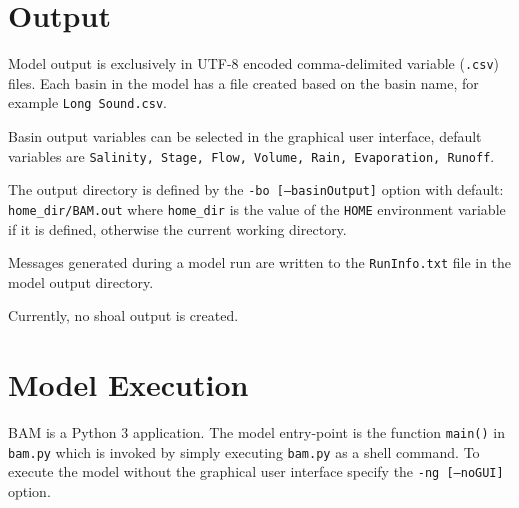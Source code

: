 \clearpage 
\section{Output}
\label{sec:Output}
Model output is exclusively in UTF-8 encoded comma-delimited variable (\texttt{.csv}) files.  Each basin in the model has a file created based on the basin name, for example \texttt{Long Sound.csv}. 

Basin output variables can be selected in the graphical user interface, default variables are \texttt{Salinity, Stage, Flow, Volume, Rain, Evaporation, Runoff}.

The output directory is defined by the \texttt{-bo [--basinOutput]} option with default: \texttt{home\_dir/BAM.out} where \texttt{home\_dir} is the value of the \texttt{HOME} environment variable if it is defined, otherwise the current working directory.

Messages generated during a model run are written to the \texttt{RunInfo.txt} file in the model output directory. 

Currently, no shoal output is created. 

\clearpage 
\section{Model Execution}
\label{sec:Model Execution}
BAM is a Python 3 application.  The model entry-point is the function \texttt{main()} in \texttt{bam.py} which is invoked by simply executing \texttt{bam.py} as a shell command.  To execute the model without the graphical user interface specify the \texttt{-ng [--noGUI]} option. 

